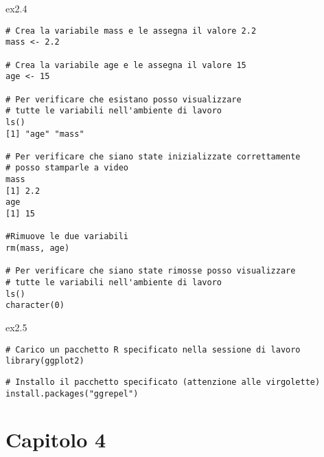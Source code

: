 \vspace{0.5cm}

\begin{solution}{ex2.4}

\begin{lstlisting}[style=Rstyle]
# Crea la variabile mass e le assegna il valore 2.2
mass <- 2.2   

# Crea la variabile age e le assegna il valore 15
age <- 15     

# Per verificare che esistano posso visualizzare 
# tutte le variabili nell'ambiente di lavoro
ls()
[1] "age" "mass"

# Per verificare che siano state inizializzate correttamente 
# posso stamparle a video 
mass 
[1] 2.2
age 
[1] 15

#Rimuove le due variabili
rm(mass, age)  

# Per verificare che siano state rimosse posso visualizzare 
# tutte le variabili nell'ambiente di lavoro
ls()
character(0)
\end{lstlisting}

\end{solution}


\vspace{0.5cm}

\begin{solution}{ex2.5}

\begin{lstlisting}[style=Rstyle]
# Carico un pacchetto R specificato nella sessione di lavoro
library(ggplot2) 
\end{lstlisting}


\begin{lstlisting}[style=Rstyle]
# Installo il pacchetto specificato (attenzione alle virgolette)
install.packages("ggrepel")  
\end{lstlisting}	

\end{solution}	


\newpage

\section{Capitolo 4}

